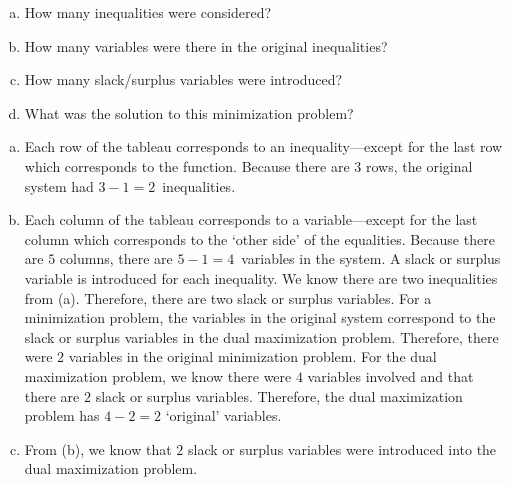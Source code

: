 \documentclass[11pt,letterpaper]{article}
\begin{document}
\begin{enumerate}[(a)]
\item How many inequalities were considered?
\item How many variables were there in the original inequalities?
\item How many slack/surplus variables were introduced?
\item What was the solution to this minimization problem?
\end{enumerate} \pspace

\sol 
\begin{enumerate}[(a)]
\item Each row of the tableau corresponds to an inequality---except for the last row which corresponds to the function. Because there are $3$ rows, the original system had $3 - 1= 2$~inequalities. 

\item Each column of the tableau corresponds to a variable---except for the last column which corresponds to the `other side' of the equalities. Because there are $5$ columns, there are $5 - 1= 4$~variables in the system. A slack or surplus variable is introduced for each inequality. We know there are two inequalities from (a). Therefore, there are two slack or surplus variables. For a minimization problem, the variables in the original system correspond to the slack or surplus variables in the dual maximization problem. Therefore, there were $2$ variables in the original minimization problem. For the dual maximization problem, we know there were $4$ variables involved and that there are $2$ slack or surplus variables. Therefore, the dual maximization problem has $4 - 2= 2$ `original' variables. 

\item From (b), we know that $2$ slack or surplus variables were introduced into the dual maximization problem. 


\end{enumerate}
\end{document}
